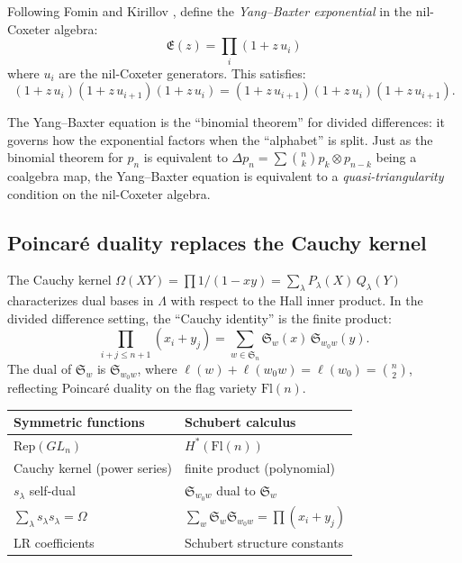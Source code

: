 \documentclass[11pt]{amsart}
\theoremstyle{definition}
\newcommand{\fS}{\mathfrak{S}}
\begin{document}
Following Fomin and Kirillov \cite{FK}, define the
\emph{Yang--Baxter exponential} in the nil-Coxeter algebra:
\[
  \mathfrak{E}(z) = \prod_{i} (1 + z\, u_i)
\]
where $u_i$ are the nil-Coxeter generators. This satisfies:
\[
  (1 + z\, u_i)(1 + z\, u_{i+1})(1 + z\, u_i)
  = (1 + z\, u_{i+1})(1 + z\, u_i)(1 + z\, u_{i+1}).
\]

The Yang--Baxter equation is the ``binomial theorem'' for divided
differences: it governs how the exponential factors when the
``alphabet'' is split. Just as the binomial theorem for $p_n$ is
equivalent to $\Delta p_n = \sum \binom{n}{k} p_k \otimes p_{n-k}$
being a coalgebra map, the Yang--Baxter equation is equivalent to a
\emph{quasi-triangularity} condition on the nil-Coxeter algebra.

\subsection{Poincar\'e duality replaces the Cauchy kernel}

The Cauchy kernel
$\Omega(XY) = \prod 1/(1-xy) = \sum_\lambda P_\lambda(X)\, Q_\lambda(Y)$
characterizes dual bases in $\Lambda$ with respect to the Hall inner
product. In the divided difference setting, the ``Cauchy identity''
is the finite product:
\[
  \prod_{i + j \leq n+1} (x_i + y_j) = \sum_{w \in \fS_n}
  \mathfrak{S}_w(x)\, \mathfrak{S}_{w_0 w}(y).
\]
The dual of $\mathfrak{S}_w$ is $\mathfrak{S}_{w_0 w}$, where
$\ell(w) + \ell(w_0 w) = \ell(w_0) = \binom{n}{2}$, reflecting
Poincar\'e duality on the flag variety $\mathrm{Fl}(n)$.

\medskip

\begin{center}
\renewcommand{\arraystretch}{1.3}
\begin{tabular}{>{\raggedright}p{5cm}
  >{\raggedright\arraybackslash}p{6cm}}
\toprule
\textbf{Symmetric functions} & \textbf{Schubert calculus} \\
\midrule
$\mathrm{Rep}(GL_n)$ & $H^*(\mathrm{Fl}(n))$ \\
Cauchy kernel (power series) & finite product (polynomial) \\
$s_\lambda$ self-dual & $\mathfrak{S}_{w_0 w}$ dual to
  $\mathfrak{S}_w$ \\
$\sum_\lambda s_\lambda s_\lambda = \Omega$ &
  $\sum_w \mathfrak{S}_w \mathfrak{S}_{w_0 w} = \prod(x_i + y_j)$ \\
LR coefficients & Schubert structure constants \\
\bottomrule
\end{tabular}
\end{center}
\end{document}
